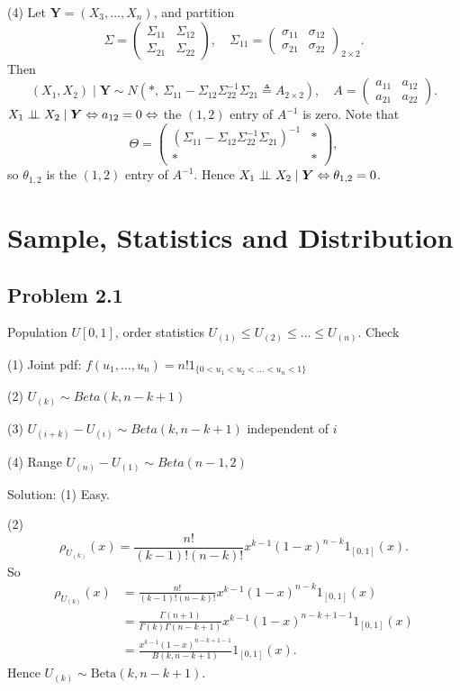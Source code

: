 (4) Let $\boldsymbol{Y}=(X_{3},\ldots,X_{n})$, and partition
\[
\Sigma=\begin{pmatrix}\Sigma_{11}&\Sigma_{12}\\ \Sigma_{21}&\Sigma_{22}\end{pmatrix},\quad \Sigma_{11}=\begin{pmatrix}\sigma_{11}&\sigma_{12}\\ \sigma_{21}&\sigma_{22}\end{pmatrix}_{2\times2}.
\]
Then
\[
(X_{1},X_{2})\mid\boldsymbol{Y}\sim N\left(*,\ \Sigma_{11}-\Sigma_{12}\Sigma_{22}^{-1}\Sigma_{21}\triangleq A_{2\times2}\right),\quad A=\begin{pmatrix}a_{11}&a_{12}\\ a_{21}&a_{22}\end{pmatrix}.
\]
$X_{1}\perp\!\!\!\perp X_{2}\mid\boldsymbol{Y}\Leftrightarrow a_{12}=0\Leftrightarrow$ the $(1,2)$ entry of $A^{-1}$ is zero.
Note that
\[
\Theta=\begin{pmatrix}(\Sigma_{11}-\Sigma_{12}\Sigma_{22}^{-1}\Sigma_{21})^{-1}&*\\ *&*\end{pmatrix},
\]
so $\theta_{1,2}$ is the $(1,2)$ entry of $A^{-1}$. Hence $X_{1}\perp\!\!\!\perp X_{2}\mid\boldsymbol{Y}\Leftrightarrow\theta_{1,2}=0$.

\section{Sample, Statistics and Distribution}

\subsection*{Problem 2.1}
Population $U[0,1]$, order statistics $U_{(1)}\leq U_{(2)}\leq\ldots\leq U_{(n)}$. Check

(1) Joint pdf: $f(u_{1},\dots,u_{n})=n!{1}_{\{0<u_{1}<u_{2}<\dots<u_{n}<1\}}$

(2) $U_{(k)}\sim Beta(k,n-k+1)$

(3) $U_{(i+k)}-U_{(i)}\sim Beta(k,n-k+1)$ independent of $i$

(4) Range $U_{(n)}-U_{(1)}\sim Beta(n-1,2)$

{Solution:}
(1) Easy.

(2)\[
\rho_{U_{(k)}}(x)=\frac{n!}{(k-1)!(n-k)!}x^{k-1}(1-x)^{n-k}{1}_{[0,1]}(x).
\]
So
\begin{align*}
\rho_{U_{(k)}}(x)&=\frac{n!}{(k-1)!(n-k)!}x^{k-1}(1-x)^{n-k}{1}_{[0,1]}(x)\\
&=\frac{\Gamma(n+1)}{\Gamma(k)\Gamma(n-k+1)}x^{k-1}(1-x)^{n-k+1-1}{1}_{[0,1]}(x)\\
&=\frac{x^{k-1}(1-x)^{n-k+1-1}}{B(k,n-k+1)}{1}_{[0,1]}(x).
\end{align*}
Hence $U_{(k)}\sim\mathrm{Beta}(k,n-k+1)$.

